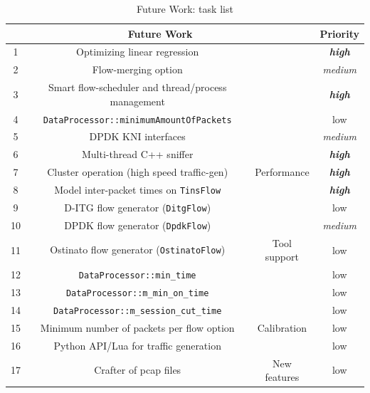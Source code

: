 \begin{table}[ht!]
    \centering
    \caption{Future Work: task list}
    \label{tab:task-list}
    \begin{tabular}{cccc}
        \hline
        \multicolumn{3}{c}{Future Work}    & Priority \\ \hline
        1   & Optimizing linear regression                       &                                & \textbf{\textit{high}} \\
        2   & Flow-merging option                                &                                & \textit{medium} \\
        3   & Smart flow-scheduler and thread/process management &                                & \textbf{\textit{high}} \\
        4   & \texttt{DataProcessor::minimumAmountOfPackets}     &                                & low \\
        5   & DPDK KNI interfaces                                &                                & \textit{medium} \\
        6   & Multi-thread C++ sniffer                           &                                & \textbf{\textit{high}} \\ 
        7   & Cluster operation (high speed traffic-gen)         & \multirow{-7}{*}{Performance}  & \textbf{\textit{high}} \\ \hline
        8   & Model inter-packet times on \texttt{TinsFlow}      &                                & \textbf{\textit{high}} \\
        9   & D-ITG flow generator (\texttt{DitgFlow})           &                                & low \\
        10  & DPDK flow generator (\texttt{DpdkFlow})            &                                & \textit{medium} \\
        11  & Ostinato flow generator (\texttt{OstinatoFlow})    & \multirow{-4}{*}{Tool support} & low \\ \hline
        12  & \texttt{DataProcessor::min\_time}                  &                                & low \\
        13  & \texttt{DataProcessor::m\_min\_on\_time}           &                                & low \\
        14  & \texttt{DataProcessor::m\_session\_cut\_time}      &                                & low \\
        15  & Minimum number of packets per flow option          & \multirow{-4}{*}{Calibration}  & low \\ \hline
        16  & Python API/Lua for traffic generation              &                                & low \\
        17  & Crafter of  pcap files                             & \multirow{-2}{*}{New features} & low \\

        \hline
    \end{tabular}
\end{table}


